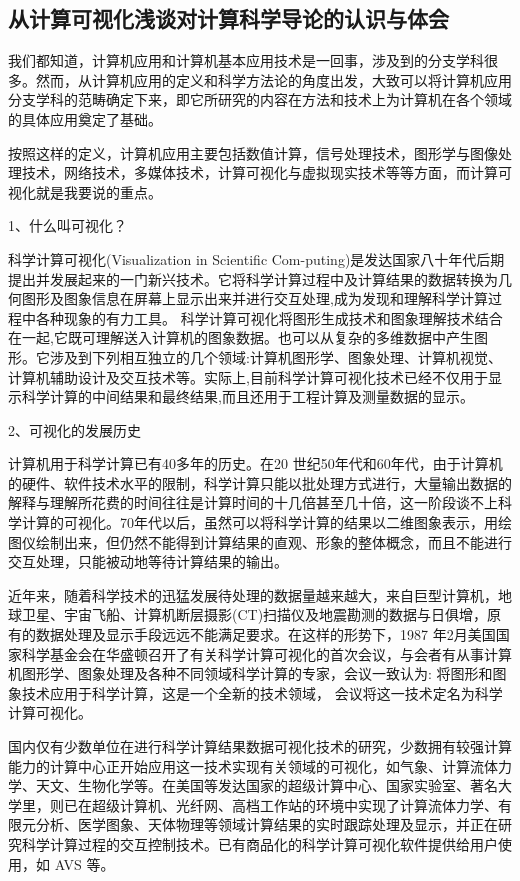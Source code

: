\documentclass{article}
\begin{document}
\subsection{从计算可视化浅谈对计算科学导论的认识与体会}
我们都知道，计算机应用和计算机基本应用技术是一回事，涉及到的分支学科很多。然而，从计算机应用的定义和科学方法论的角度出发，大致可以将计算机应用分支学科的范畴确定下来，即它所研究的内容在方法和技术上为计算机在各个领域的具体应用奠定了基础。\par 
按照这样的定义，计算机应用主要包括数值计算，信号处理技术，图形学与图像处理技术，网络技术，多媒体技术，计算可视化与虚拟现实技术等等方面，而计算可视化就是我要说的重点。\par 
1、什么叫可视化？\par 
科学计算可视化(Visualization in Scientific Com-puting)是发达国家八十年代后期提出并发展起来的一门新兴技术。它将科学计算过程中及计算结果的数据转换为几何图形及图象信息在屏幕上显示出来并进行交互处理,成为发现和理解科学计算过程中各种现象的有力工具。 科学计算可视化将图形生成技术和图象理解技术结合在一起,它既可理解送入计算机的图象数据。也可以从复杂的多维数据中产生图形。它涉及到下列相互独立的几个领域:计算机图形学、图象处理、计算机视觉、计算机辅助设计及交互技术等。实际上,目前科学计算可视化技术已经不仅用于显示科学计算的中间结果和最终结果,而且还用于工程计算及测量数据的显示。\citep{c}\par
2、可视化的发展历史\par
 计算机用于科学计算已有40多年的历史。在20 世纪50年代和60年代，由于计算机的硬件、软件技术水平的限制，科学计算只能以批处理方式进行，大量输出数据的解释与理解所花费的时间往往是计算时间的十几倍甚至几十倍，这一阶段谈不上科学计算的可视化。70年代以后，虽然可以将科学计算的结果以二维图象表示，用绘图仪绘制出来，但仍然不能得到计算结果的直观、形象的整体概念，而且不能进行交互处理，只能被动地等待计算结果的输出。\par 
 近年来，随着科学技术的迅猛发展待处理的数据量越来越大，来自巨型计算机，地球卫星、宇宙飞船、计算机断层摄影(CT)扫描仪及地震勘测的数据与日俱增，原有的数据处理及显示手段远远不能满足要求。在这样的形势下，1987 年2月美国国家科学基金会在华盛顿召开了有关科学计算可视化的首次会议，与会者有从事计算机图形学、图象处理及各种不同领域科学计算的专家，会议一致认为: 将图形和图象技术应用于科学计算，这是一个全新的技术领域， 会议将这一技术定名为科学计算可视化。\par 
 国内仅有少数单位在进行科学计算结果数据可视化技术的研究，少数拥有较强计算能力的计算中心正开始应用这一技术实现有关领域的可视化，如气象、计算流体力学、天文、生物化学等。在美国等发达国家的超级计算中心、国家实验室、著名大学里，则已在超级计算机、光纤网、高档工作站的环境中实现了计算流体力学、有限元分析、医学图象、天体物理等领域计算结果的实时跟踪处理及显示，并正在研究科学计算过程的交互控制技术。已有商品化的科学计算可视化软件提供给用户使用，如 AVS 等。\par 
\end{document}
